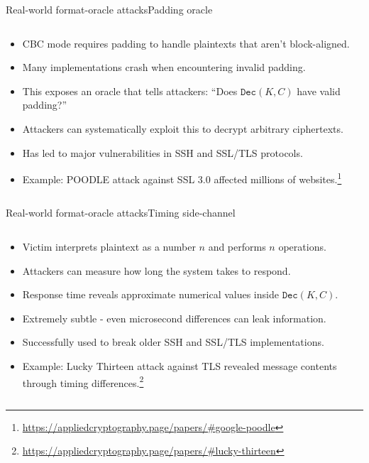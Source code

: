 \documentclass[aspectratio=169, lualatex, handout]{beamer}
\begin{document}
\begin{frame}{Real-world format-oracle attacks}{Padding oracle}
	\begin{columns}[c]
		\begin{column}{1\textwidth}
			\begin{itemize}[<+->]
				\item CBC mode requires padding to handle plaintexts that aren't block-aligned.
				\item Many implementations crash when encountering invalid padding.
				\item This exposes an oracle that tells attackers: ``Does $\texttt{Dec}(K, C)$ have valid padding?''
				\item Attackers can systematically exploit this to decrypt arbitrary ciphertexts.
				\item Has led to major vulnerabilities in SSH and SSL/TLS protocols.
				\item Example: POODLE attack against SSL 3.0 affected millions of websites.\footnote{\url{https://appliedcryptography.page/papers/\#google-poodle}}
			\end{itemize}
		\end{column}
	\end{columns}
\end{frame}

\begin{frame}{Real-world format-oracle attacks}{Timing side-channel}
	\begin{columns}[c]
		\begin{column}{1\textwidth}
			\begin{itemize}[<+->]
				\item Victim interprets plaintext as a number $n$ and performs $n$ operations.
				\item Attackers can measure how long the system takes to respond.
				\item Response time reveals approximate numerical values inside $\texttt{Dec}(K, C)$.
				\item Extremely subtle - even microsecond differences can leak information.
				\item Successfully used to break older SSH and SSL/TLS implementations.
				\item Example: Lucky Thirteen attack against TLS revealed message contents through timing differences.\footnote{\url{https://appliedcryptography.page/papers/\#lucky-thirteen}}
			\end{itemize}
		\end{column}
	\end{columns}
\end{frame}
\end{document}
